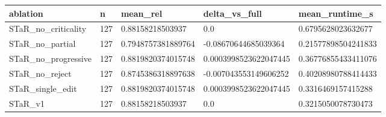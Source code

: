 \begin{tabular}{lllll}
 \hline
 ablation & n & mean\_rel & delta\_vs\_full & mean\_runtime\_s \\
 \hline
 STaR\_no\_criticality & 127 & 0.88158218503937 & 0.0 & 0.6795628023632677 \\
 STaR\_no\_partial & 127 & 0.7948757381889764 & -0.08670644685039364 & 0.21577898504241833 \\
 STaR\_no\_progressive & 127 & 0.8819820374015748 & 0.0003998523622047445 & 0.36776855433411076 \\
 STaR\_no\_reject & 127 & 0.8745386318897638 & -0.007043553149606252 & 0.40208980788414433 \\
 STaR\_single\_edit & 127 & 0.8819820374015748 & 0.0003998523622047445 & 0.3316469157415288 \\
 STaR\_v1 & 127 & 0.88158218503937 & 0.0 & 0.3215050078730473 \\
 \hline
\end{tabular}
